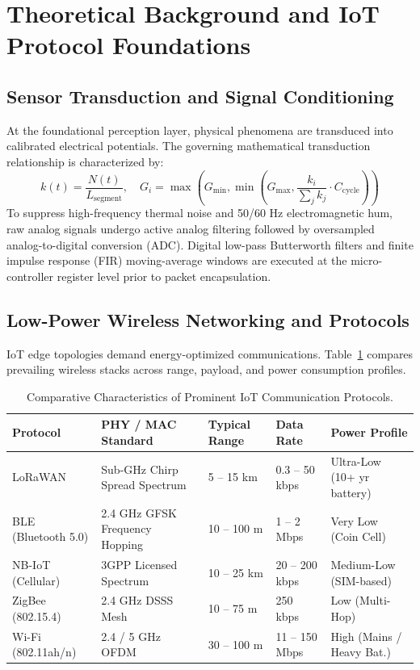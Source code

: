 \section{Theoretical Background and IoT Protocol Foundations}

\subsection{Sensor Transduction and Signal Conditioning}
At the foundational perception layer, physical phenomena are transduced into calibrated electrical potentials. The governing mathematical transduction relationship is characterized by:
\begin{equation}
  k(t) = \frac{N(t)}{L_{\text{segment}}}, \quad G_i = \max\left(G_{\min}, \min\left(G_{\max}, \frac{k_i}{\sum_j k_j} \cdot C_{\text{cycle}}\right)\right)
\label{eq:core_math}
\end{equation}
To suppress high-frequency thermal noise and 50/60 Hz electromagnetic hum, raw analog signals undergo active analog filtering followed by oversampled analog-to-digital conversion (ADC). Digital low-pass Butterworth filters and finite impulse response (FIR) moving-average windows are executed at the micro-controller register level prior to packet encapsulation.

\subsection{Low-Power Wireless Networking and Protocols}
IoT edge topologies demand energy-optimized communications. Table~\ref{tab:proto_comp} compares prevailing wireless stacks across range, payload, and power consumption profiles.
\begin{table}[H]
\centering
\caption{Comparative Characteristics of Prominent IoT Communication Protocols.}
\label{tab:proto_comp}
\begin{tabularx}{\linewidth}{lXXXX}
\toprule
\textbf{Protocol} & \textbf{PHY / MAC Standard} & \textbf{Typical Range} & \textbf{Data Rate} & \textbf{Power Profile} \\
\midrule
LoRaWAN & Sub-GHz Chirp Spread Spectrum & 5 -- 15 km & 0.3 -- 50 kbps & Ultra-Low (10+ yr battery) \\
BLE (Bluetooth 5.0) & 2.4 GHz GFSK Frequency Hopping & 10 -- 100 m & 1 -- 2 Mbps & Very Low (Coin Cell) \\
NB-IoT (Cellular) & 3GPP Licensed Spectrum & 10 -- 25 km & 20 -- 200 kbps & Medium-Low (SIM-based) \\
ZigBee (802.15.4) & 2.4 GHz DSSS Mesh & 10 -- 75 m & 250 kbps & Low (Multi-Hop) \\
Wi-Fi (802.11ah/n) & 2.4 / 5 GHz OFDM & 30 -- 100 m & 11 -- 150 Mbps & High (Mains / Heavy Bat.) \\
\bottomrule
\end{tabularx}
\end{table}

